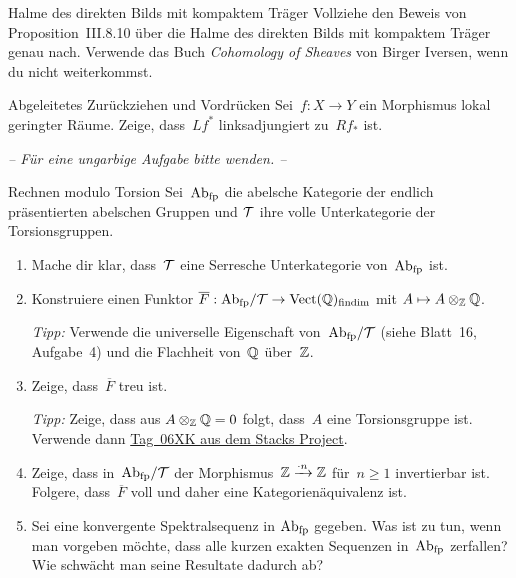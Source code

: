 \documentclass{uebblatt}
\begin{document}
\begin{aufgabe}{Halme des direkten Bilds mit kompaktem Träger}
Vollziehe den Beweis von Proposition~III.8.10 über die Halme des direkten Bilds
mit kompaktem Träger genau nach. Verwende das Buch \emph{Cohomology of Sheaves}
von Birger Iversen, wenn du nicht weiterkommst.
\end{aufgabe}

\begin{aufgabe}{Abgeleitetes Zurückziehen und Vordrücken}
Sei~$f : X \to Y$ ein Morphismus lokal geringter Räume. Zeige, dass~$Lf^*$
linksadjungiert zu~$Rf_*$ ist.
\end{aufgabe}

\begin{center}\emph{-- Für eine ungarbige Aufgabe bitte wenden. --}\end{center}

\newpage

\begin{aufgabe}{Rechnen modulo Torsion}
Sei~$\mathrm{Ab}_\text{fp}$ die abelsche Kategorie der endlich präsentierten abelschen
Gruppen und $\mathcal{T}$ ihre volle Unterkategorie der Torsionsgruppen.
\begin{enumerate}
\item Mache dir klar, dass~$\mathcal{T}$ eine Serresche Unterkategorie
von~$\mathrm{Ab}_\text{fp}$ ist.
\item Konstruiere einen Funktor $\overline{F} : \mathrm{Ab}_\text{fp}/\mathcal{T} \to
\mathrm{Vect}(\mathbb{Q})_\text{findim}$ mit $A \mapsto A \otimes_{\mathbb{Z}} \mathbb{Q}$.

{\tiny\emph{Tipp:} Verwende die universelle Eigenschaft von~$\mathrm{Ab}_\text{fp}/\mathcal{T}$
(siehe Blatt~16, Aufgabe~4) und die Flachheit von~$\mathbb{Q}$ über~$\mathbb{Z}$.\par}

\item Zeige, dass~$\overline{F}$ treu ist.

{\tiny\emph{Tipp:} Zeige, dass aus $A \otimes_{\mathbb{Z}} \mathbb{Q} = 0$ folgt,
dass~$A$ eine Torsionsgruppe ist. Verwende dann
\href{http://stacks.math.columbia.edu/tag/06XK}{Tag~06XK aus dem Stacks
Project}.\par}
\item Zeige, dass in~$\mathrm{Ab}_\text{fp}/\mathcal{T}$ der Morphismus~$\mathbb{Z} \xrightarrow{\cdot
n} \mathbb{Z}$ für~$n \geq 1$ invertierbar ist. Folgere, dass~$\overline{F}$
voll und daher eine Kategorienäquivalenz ist.
\item Sei eine konvergente Spektralsequenz in $\mathrm{Ab}_\text{fp}$ gegeben. Was ist
zu tun, wenn man vorgeben möchte, dass alle kurzen exakten Sequenzen
in~$\mathrm{Ab}_\text{fp}$ zerfallen? Wie schwächt man seine Resultate dadurch ab?
\end{enumerate}
\end{aufgabe}
\end{document}
